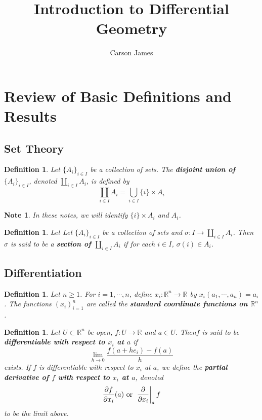 \documentclass[12pt]{amsart}
\newtheorem{defn}[thm]{Definition}
\newtheorem{note}[thm]{Note}
\newcommand{\sig}{\sigma}
\newcommand{\R}{\mathbb{R}}
\begin{document}
	
	\title{Introduction to Differential Geometry}
	\author{Carson James}
	\maketitle
	
	\tableofcontents
	
	\section{Review of Basic Definitions and Results}

	\subsection{Set Theory}
	
	\begin{defn}
		Let $\{A_i\}_{i \in I}$ be a collection of sets. The \textbf{disjoint union of} $\{A_i\}_{i \in I}$, denoted $\coprod\limits_{i \in I} A_i$, is defined by $$\coprod_{i \in I}A_i = \bigcup_{i\in I} \{i\} \times A_i$$ 
	\end{defn}

	\begin{note}
		In these notes, we will identify $\{i\} \times A_i$ and $A_i$.
	\end{note}

	\begin{defn}
		Let Let $\{A_i\}_{i \in I}$ be a collection of sets and $\sig: I \rightarrow \coprod\limits_{i \in I} A_i$. Then $\sig$ is said to be a \textbf{section of $\coprod\limits_{i \in I} A_i$} if for each $i \in I$, $\sig(i) \in A_i$.
	\end{defn}
	
	\subsection{Differentiation}
	
	\begin{defn}
		Let $n \geq 1$. For $i = 1, \cdots, n$, define $x_i: \R^n \rightarrow \R$ by $x_i(a_1, \cdots, a_n) = a_i$. The functions $(x_i)_{i=1}^n$ are called the \textbf{standard coordinate functions on $\R^n$}. 
	\end{defn}
	
	\begin{defn} 
		Let $U \subset \R^n$ be open, $f: U \rightarrow \R$ and $a \in U$. Then$f$ is said to be \textbf{differentiable with respect to $x_i$ at $a$} if $$\lim\limits_{h \rightarrow 0} \frac{f(a + he_i) - f(a)}{h}$$ exists. If $f$ is differentiable with respect to $x_i$ at $a$, we define the \textbf{partial derivative of $f$ with respect to $x_i$ at $a$}, denoted $$\frac{\partial f}{\partial x_i} (a) \text{ or } \eval{\pdv{x_i}}_{a} f $$ to be the limit above.
		
	\end{defn}
		
\end{document}

